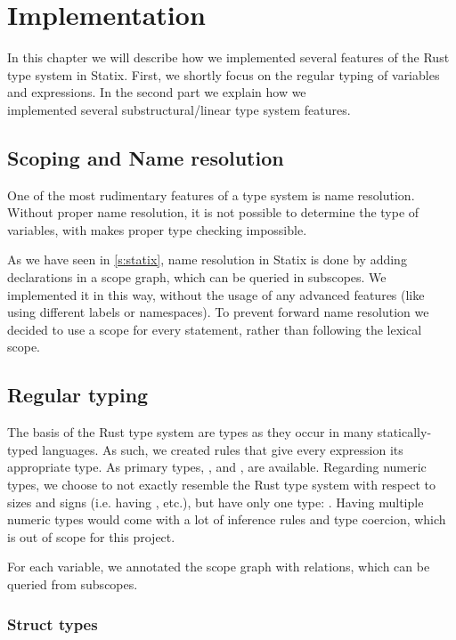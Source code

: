 \section{Implementation} \label{s:implementation}

In this chapter we will describe how we implemented several features of the Rust type system in Statix. First, we shortly focus on the regular typing of variables and expressions. In the second part we explain how we\\ implemented several substructural/linear type system features.

\subsection{Scoping and Name resolution}

One of the most rudimentary features of a type system is name resolution. Without proper name resolution, it is not possible to determine the type of variables, with makes proper type checking impossible.

As we have seen in \autoref{s:statix}, name resolution in Statix is done by adding declarations in a scope graph, which can be queried in subscopes. We implemented it in this way, without the usage of any advanced features (like using different labels or namespaces). 
To prevent forward name resolution we decided to use a scope for every statement, rather than following the lexical scope.

\subsection{Regular typing} \label{sec:regular-typing}

The basis of the Rust type system are types as they occur in many statically-typed languages. As such, we created rules  that give every expression its appropriate type. As primary types, ,  and , are available. Regarding numeric types, we choose to not exactly resemble the Rust type system with respect to sizes and signs (i.e. having ,  etc.), but have only one type: . Having multiple numeric types would come with a lot of inference rules and type coercion, which is out of scope for this project.

For each variable, we annotated the scope graph with  relations, which can be queried from subscopes.

\subsubsection{Struct types} \label{sec:struct-type}

